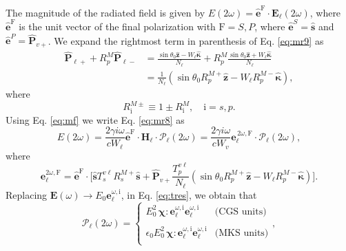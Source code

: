 The magnitude of the radiated field is given by $E(2\omega) =
\hat{\mathbf{e}}^{\mathrm{F}}\cdot\mathbf{E}_{\ell}(2\omega)$, where
$\hat{\mathbf{e}}^{\mathrm{F}}$ is the unit vector of the final polarization
with $\mathrm{F}=S,P$, where $\hat{\mathbf{e}}^S=\hat{\mathbf{s}}$ and
$\hat{\mathbf{e}}^P=\hat{\mathbf{P}}_{v+}$. We expand the rightmost term in
parenthesis of Eq. \eqref{eq:mr9} as
\begin{equation}
\begin{split}
\hat{\mathbf{P}}_{\ell +} + R^{M}_{p}\hat{\mathbf{P}}_{\ell -}
&= \frac{\sin\theta_{0}\hat{\mathbf{z}} - W_{\ell}\hat{\boldsymbol{\kappa}}}
        {N_{\ell}}
 + R^{M}_{p}
   \frac{\sin\theta_{0}\hat{\mathbf{z}} + W_{\ell}\hat{\boldsymbol{\kappa}}}
        {N_{\ell}}\\
&= \frac{1}{N_{\ell}}
\left(
\sin\theta_{0}R^{M+}_{p}\hat{\mathbf{z}}
- W_{\ell}R^{M-}_{p}\hat{\boldsymbol{\kappa}}
\right),
\end{split}
\end{equation}
where
\begin{equation}\label{eq:rm}
R^{M\pm}_{\mathrm{i}}\equiv 1 \pm R^{M}_{\mathrm{i}}, \quad \mathrm{i}=s,p.
\end{equation}
Using Eq. \eqref{eq:mf} we write Eq. \eqref{eq:mr8} as
\begin{equation}\label{eq:r10}
E(2\omega) = \frac{2\gamma i\omega}{cW_\ell}
\hat{\mathbf{e}}^{\mathrm{F}}\cdot\mathbf{H}_{\ell}\cdot
\boldsymbol{\mathcal{P}}_{\ell}(2\omega) 
= \frac{2\gamma i\omega}{cW_{v}}
\mathbf{e}^{\,2\omega,\mathrm{F}}_{\ell}\cdot
\boldsymbol{\mathcal{P}}_{\ell}(2\omega),
\end{equation}
where
\begin{equation}\label{eq:r12mm}
\mathbf{e}^{2\omega,\mathrm{F}}_{\ell} =\hat{\mathbf{e}}^{\mathrm{F}}\cdot 
\Bigg[
\hat{\mathbf{s}}T_{s}^{v\ell}R^{M+}_{s}\hat{\mathbf{s}} + 
\hat{\mathbf{P}}_{v+}
\frac{T^{v\ell}_{p}}
     {N_{\ell}}
\left(
\sin\theta_{0}R^{M+}_{p}\hat{\mathbf{z}}
- W_{\ell}R^{M-}_{p}\hat{\boldsymbol{\kappa}}
\right) 
\Bigg]. 
\end{equation}  
Replacing $\mathbf{E}(\omega)\to E_0\mathbf{e}^{\omega,\mathrm{i}}_\ell$, in Eq.
\eqref{eq:tres}, we obtain that
\begin{equation}\label{eq:m4}
\boldsymbol{\mathcal{P}}_{\ell}(2\omega) = 
\left\{
\begin{array}{cc}  
E^{2}_{0}\,
\boldsymbol{\chi}:\mathbf{e}^{\omega,\mathrm{i}}_{\ell}
                  \mathbf{e}^{\omega,\mathrm{i}}_{\ell}
& \text{(CGS units)}\\\\
\epsilon_{0}E^{2}_{0}\,
\boldsymbol{\chi}:\mathbf{e}^{\omega,\mathrm{i}}_{\ell}
                  \mathbf{e}^{\omega,\mathrm{i}}_{\ell}
& \text{(MKS units)}\\
\end{array}
\right.,
\end{equation}
